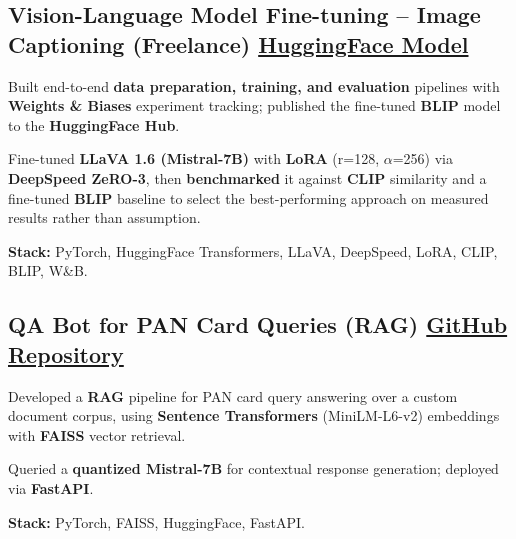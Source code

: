 \documentclass[letter,10pt]{article}
\begin{document}
\subsection{Vision-Language Model Fine-tuning – Image Captioning (Freelance) \hfill \href{https://huggingface.co/sunil448832/blip-model}{HuggingFace Model}}
\begin{zitemize}
\item Built end-to-end \textbf{data preparation, training, and evaluation} pipelines with \textbf{Weights \& Biases} experiment tracking; published the fine-tuned \textbf{BLIP} model to the \textbf{HuggingFace Hub}.
\item Fine-tuned \textbf{LLaVA 1.6 (Mistral-7B)} with \textbf{LoRA} (r=128, $\alpha$=256) via \textbf{DeepSpeed ZeRO-3}, then \textbf{benchmarked} it against \textbf{CLIP} similarity and a fine-tuned \textbf{BLIP} baseline to select the best-performing approach on measured results rather than assumption.
\item \textbf{Stack:} PyTorch, HuggingFace Transformers, LLaVA, DeepSpeed, LoRA, CLIP, BLIP, W\&B.
\end{zitemize}

\subsection{QA Bot for PAN Card Queries (RAG) \hfill \href{https://github.com/sunil448832/Natural-Language-Processing/tree/master/RAG(Retrieval\%20Augment\%20Generation)}{GitHub Repository}}
\begin{zitemize}
\item Developed a \textbf{RAG} pipeline for PAN card query answering over a custom document corpus, using \textbf{Sentence Transformers} (MiniLM-L6-v2) embeddings with \textbf{FAISS} vector retrieval.
\item Queried a \textbf{quantized Mistral-7B} for contextual response generation; deployed via \textbf{FastAPI}.
\item \textbf{Stack:} PyTorch, FAISS, HuggingFace, FastAPI.
\end{zitemize}
\end{document}
